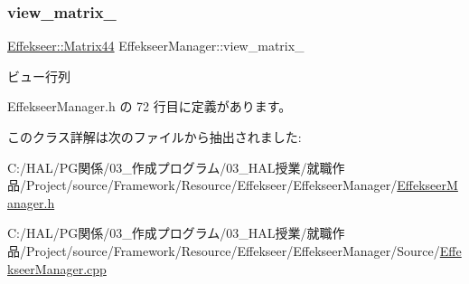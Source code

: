 \subsubsection{\texorpdfstring{view\+\_\+matrix\+\_\+}{view\_matrix\_}}
{\footnotesize\ttfamily \mbox{\hyperlink{struct_effekseer_1_1_matrix44}{Effekseer\+::\+Matrix44}} Effekseer\+Manager\+::view\+\_\+matrix\+\_\+\hspace{0.3cm}{\ttfamily [private]}}



ビュー行列 



 Effekseer\+Manager.\+h の 72 行目に定義があります。



このクラス詳解は次のファイルから抽出されました\+:\begin{DoxyCompactItemize}
\item 
C\+:/\+H\+A\+L/\+P\+G関係/03\+\_\+作成プログラム/03\+\_\+\+H\+A\+L授業/就職作品/\+Project/source/\+Framework/\+Resource/\+Effekseer/\+Effekseer\+Manager/\mbox{\hyperlink{_effekseer_manager_8h}{Effekseer\+Manager.\+h}}\item 
C\+:/\+H\+A\+L/\+P\+G関係/03\+\_\+作成プログラム/03\+\_\+\+H\+A\+L授業/就職作品/\+Project/source/\+Framework/\+Resource/\+Effekseer/\+Effekseer\+Manager/\+Source/\mbox{\hyperlink{_effekseer_manager_8cpp}{Effekseer\+Manager.\+cpp}}\end{DoxyCompactItemize}
